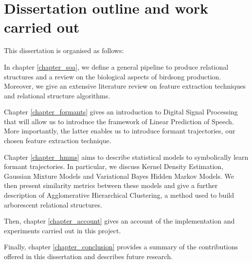 \documentclass[../main.tex]{subfiles}
\begin{document}
\section{Dissertation outline and work carried out}
This dissertation is organised as follows:
\par In chapter \ref{chapter_soa}, we define a general pipeline to produce relational structures and a review on the biological aspects of birdsong production. Moreover, we give an extensive literature review on feature extraction techniques and relational structure algorithms.
\par Chapter \ref{chapter_formants} gives an introduction to Digital Signal Processing that will allow us to introduce the framework of Linear Prediction of Speech. More importantly, the latter enables us to introduce formant trajectories, our chosen feature extraction technique.
\par Chapter \ref{chapter_hmms} aims to describe statistical models to symbolically learn formant trajectories. In particular, we discuss Kernel Density Estimation, Gaussian Mixture Models and Variational Bayes Hidden Markov Models. We then present similarity metrics between these models and give a further description of Agglomerative Hierarchical Clustering, a method used to build arborescent relational structures.
\par Then, chapter \ref{chapter_account} gives an account of the implementation and experiments carried out in this project.
\par Finally, chapter \ref{chapter_conclusion} provides a summary of the contributions offered in this dissertation and describes future research.
\end{document}
